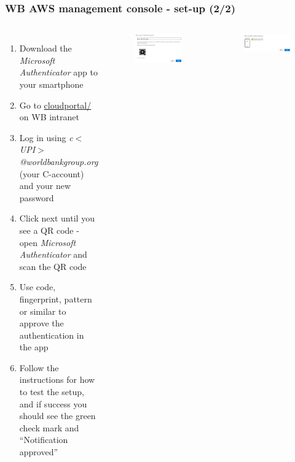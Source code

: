 \documentclass[aspectratio=169]{beamer} %
\begin{document}
\begin{frame}
	\frametitle{WB AWS management console - set-up (2/2)}
	\begin{columns}[c]


		\begin{enumerate}
			\item Download the \textit{Microsoft Authenticator} app to your smartphone
			\item Go to \url{cloudportal/} on WB intranet
			\item Log in using \textit{c$<$UPI$>$@worldbankgroup.org}
			(your C-account) and your new password
			\item Click next until you see a QR code
			- open \textit{Microsoft Authenticator} and scan the QR code
			\item Use code, fingerprint, pattern or similar to approve the authentication in the app
			\item Follow the instructions for how to test the setup,
			and if success you should see the green check mark and ``Notification approved''

		\end{enumerate}

		\begin{figure}
			\centering
			\includegraphics[width=1\textwidth]{./img/microsoft-auth-1.png}
		\end{figure}
			\begin{figure}
			\centering
			\includegraphics[width=1\textwidth]{./img/microsoft-auth-2.png}
		\end{figure}

	\end{columns}
\end{frame}
\end{document}
